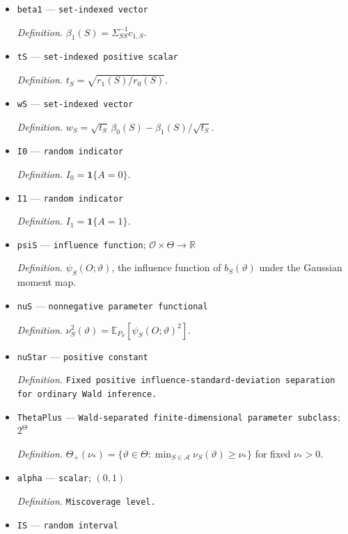 \documentclass{article}
\begin{document}
\begin{itemize}
  \item \texttt{beta1} --- \texttt{set-\allowbreak{}indexed vector}
  \par\smallskip\noindent\emph{Definition.} \(\beta_1(S)=\Sigma_{SS}^{-1}c_{1,S}\).
  \item \texttt{tS} --- \texttt{set-\allowbreak{}indexed positive scalar}
  \par\smallskip\noindent\emph{Definition.} \(t_S=\sqrt{r_1(S)/r_0(S)}\).
  \item \texttt{wS} --- \texttt{set-\allowbreak{}indexed vector}
  \par\smallskip\noindent\emph{Definition.} \(w_S=\sqrt{t_S}\,\beta_0(S)-\beta_1(S)/\sqrt{t_S}\).
  \item \texttt{I0} --- \texttt{random indicator}
  \par\smallskip\noindent\emph{Definition.} \(I_0=\mathbf 1\{A=0\}\).
  \item \texttt{I1} --- \texttt{random indicator}
  \par\smallskip\noindent\emph{Definition.} \(I_1=\mathbf 1\{A=1\}\).
  \item \texttt{psiS} --- \texttt{influence function}; \(\mathcal O\times\Theta\to\mathbb R\)
  \par\smallskip\noindent\emph{Definition.} \(\psi_S(O;\vartheta)\), the influence function of \(b_S(\vartheta)\) under the Gaussian moment map.
  \item \texttt{nuS} --- \texttt{nonnegative parameter functional}
  \par\smallskip\noindent\emph{Definition.} \(\nu_S^2(\vartheta)=\mathbb E_{P_{\vartheta}}[\psi_S(O;\vartheta)^2]\).
  \item \texttt{nuStar} --- \texttt{positive constant}
  \par\smallskip\noindent\emph{Definition.} \texttt{Fixed positive influence-\allowbreak{}standard-\allowbreak{}deviation separation for ordinary Wald inference.}
  \item \texttt{ThetaPlus} --- \texttt{Wald-\allowbreak{}separated finite-\allowbreak{}dimensional parameter subclass}; \(2^{\Theta}\)
  \par\smallskip\noindent\emph{Definition.} \(\Theta_+(\nu_*)=\{\vartheta\in\Theta:\min_{S\in\mathcal A}\nu_S(\vartheta)\ge\nu_*\}\) for fixed \(\nu_*>0\).
  \item \texttt{alpha} --- \texttt{scalar}; \((0,1)\)
  \par\smallskip\noindent\emph{Definition.} \texttt{Miscoverage level.}
  \item \texttt{IS} --- \texttt{random interval}

\end{itemize}
\end{document}
